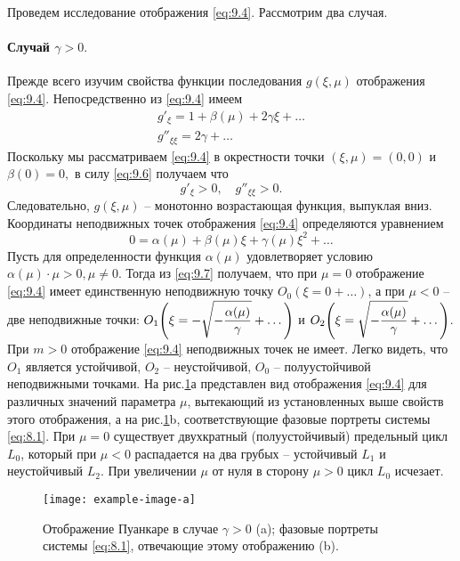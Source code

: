 Проведем исследование отображения \eqref{eq:9.4}. Рассмотрим два случая.

\paragraph{Случай $\gamma>0.$}%
Прежде всего изучим свойства функции последования $g(\xi,\mu)$ отображения
\eqref{eq:9.4}. Непосредственно из \eqref{eq:9.4} имеем
\begin{equation}
        \label{eq:9.6}
        \begin{gathered}
                g'_{\xi} = 1 + \beta(\mu) + 2 \gamma \xi+ \dots \\
                g''_{\xi\xi} = 2 \gamma + \dots
        \end{gathered}
\end{equation}
Поскольку мы рассматриваем \eqref{eq:9.4} в окрестности точки $(\xi,\mu)=(0,0)$ и $\beta(0)=0,$ 
в силу \eqref{eq:9.6} получаем что
\begin{equation}
        \label{eq:}
        g'_{\xi}>0,\quad g''_{\xi\xi}>0.
\end{equation}
Следовательно, $g(\xi,\mu)$ -- монотонно возрастающая функция, выпуклая вниз.
Координаты неподвижных точек отображения \eqref{eq:9.4} определяются уравнением
\begin{equation}
        \label{eq:9.7}
        0 = \alpha(\mu) + \beta(\mu) \xi + \gamma(\mu) \xi^2 + \dots
\end{equation}
Пусть для определенности функция $\alpha(\mu)$ удовлетворяет условию $\alpha(\mu)\cdot \mu>0, \mu \neq 0.$ Тогда из \eqref{eq:9.7} получаем, что при $\mu=0$ отображение \eqref{eq:9.4} имеет единственную неподвижную точку $O_0 (\xi=0+\dots)$, а при $\mu<0$ -- две неподвижные точки:
$\displaystyle O_1 \qty( \xi = - \sqrt{ -\frac{\alpha(\mu)}{\gamma}} + \dots )$ и
$\displaystyle O_2 \qty( \xi = \sqrt{ -\frac{\alpha(\mu)}{\gamma}}+\dots)$. 
При $m>0$ отображение \eqref{eq:9.4} неподвижных точек не имеет. Легко видеть, что $O_1$ является устойчивой, $O_2$ -- неустойчивой, $O_0$ -- полуустойчивой неподвижными точками.
На рис.\ref{fig:9.2}а представлен вид отображения \eqref{eq:9.4} для различных значений параметра $\mu$,
вытекающий из установленных выше свойств этого отображения, а на рис.\ref{fig:9.2}b, соответствующие
фазовые портреты системы \eqref{eq:8.1}. При $\mu=0$ существует двухкратный (полуустойчивый) предельный цикл $L_0$, который при $\mu<0$ распадается на два грубых -- устойчивый $L_1$ и неустойчивый $L_2$.
При увеличении $\mu$ от нуля в сторону $\mu>0$ цикл $L_0$ исчезает.
\begin{figure}[h]
        \centering
        \texttt{[image: example-image-a]}
        \caption{Отображение Пуанкаре в случае $\gamma>0$ (a); фазовые портреты системы  \eqref{eq:8.1}, отвечающие этому отображению (b).}
        \label{fig:9.2}
\end{figure}

